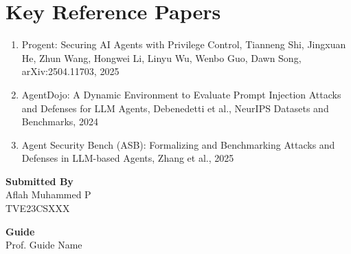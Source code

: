 \documentclass[12pt]{article}
\newcommand{\studentname}{Aflah Muhammed P}
\newcommand{\rollno}{TVE23CSXXX}
\newcommand{\guidename}{Prof. Guide Name}
\begin{document}
\section*{Key Reference Papers}
\begin{enumerate}
  \item Progent: Securing AI Agents with Privilege Control, Tianneng Shi, Jingxuan He, Zhun Wang, Hongwei Li, Linyu Wu, Wenbo Guo, Dawn Song, arXiv:2504.11703, 2025
  \item AgentDojo: A Dynamic Environment to Evaluate Prompt Injection Attacks and Defenses for LLM Agents, Debenedetti et al., NeurIPS Datasets and Benchmarks, 2024
  \item Agent Security Bench (ASB): Formalizing and Benchmarking Attacks and Defenses in LLM-based Agents, Zhang et al., 2025
\end{enumerate}
\vspace{1.5em}

\noindent\textbf{Submitted By}\\
\studentname\\
\rollno

\vspace{1em}
\noindent\textbf{Guide}\\
\guidename
\end{document}
